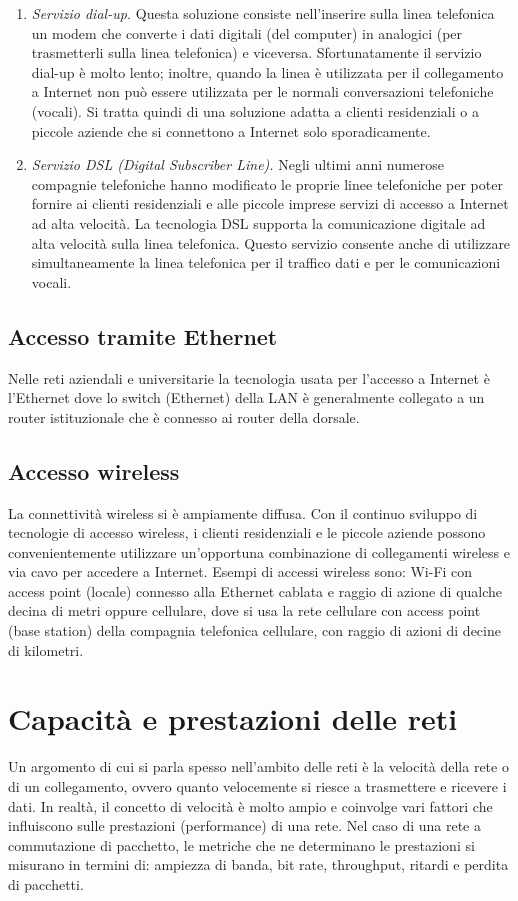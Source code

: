 \begin{enumerate}
    \item \textit{Servizio dial-up.} Questa soluzione consiste nell'inserire sulla linea telefonica un modem che converte i dati digitali (del computer) in analogici (per trasmetterli sulla linea telefonica) e viceversa. Sfortunatamente il servizio dial-up è molto lento; inoltre, quando la linea è utilizzata per il collegamento a Internet non può essere utilizzata per le normali conversazioni telefoniche (vocali). Si tratta quindi di una soluzione adatta a clienti residenziali o a piccole aziende che si connettono a Internet solo sporadicamente.
    \item \textit{Servizio DSL (Digital Subscriber Line).} Negli ultimi anni numerose compagnie telefoniche hanno modificato le proprie linee telefoniche per poter fornire ai clienti residenziali e alle piccole imprese servizi di accesso a Internet ad alta velocità. La tecnologia DSL supporta la comunicazione digitale ad alta velocità sulla linea telefonica. Questo servizio consente anche di utilizzare simultaneamente la linea telefonica per il traffico dati e per le comunicazioni vocali.
\end{enumerate}

\subsection{Accesso tramite Ethernet}
Nelle reti aziendali e universitarie la tecnologia usata per l'accesso a Internet è l'Ethernet dove lo switch (Ethernet) della LAN è generalmente collegato a un router istituzionale che è connesso ai router della dorsale.

\subsection{Accesso wireless}
La connettività wireless si è ampiamente diffusa. Con il continuo sviluppo di tecnologie di accesso wireless, i clienti residenziali e le piccole aziende possono convenientemente utilizzare un'opportuna combinazione di collegamenti wireless e via cavo per accedere a Internet. Esempi di accessi wireless sono: Wi-Fi con access point (locale) connesso alla Ethernet cablata e raggio di azione di qualche decina di metri oppure cellulare, dove si usa la rete cellulare con access point (base station) della compagnia telefonica cellulare, con raggio di azioni di decine di kilometri.

\section{Capacità e prestazioni delle reti}
Un argomento di cui si parla spesso nell'ambito delle reti è la velocità della rete o di un collegamento, ovvero quanto velocemente si riesce a trasmettere e ricevere i dati. In realtà, il concetto di velocità è molto ampio e coinvolge vari fattori che influiscono sulle prestazioni (performance) di una rete.
Nel caso di una rete a commutazione di pacchetto, le metriche che ne determinano le prestazioni si misurano in termini di: ampiezza di banda, bit rate, throughput, ritardi e perdita di pacchetti.

